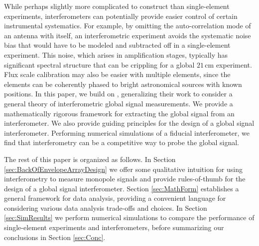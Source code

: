 \documentclass[twocolumn,apj,numberedappendix]{emulateapj}
\newcommand{\mep}[1]{{\color{applegreen} \textbf{[MEP:  #1]}}}
\begin{document}
While perhaps slightly more complicated to construct than single-element experiments, interferometers can potentially provide easier control of certain instrumental systematics. For example, by omitting the auto-correlation mode of an antenna with itself, an interferometric experiment avoids the systematic noise bias that would have to be modeled and subtracted off in a single-element experiment. This noise, which arises in amplification stages, typically has significant spectral structure that can be crippling for a global $21\,\textrm{cm}$ experiment. Flux scale calibration may also be easier with multiple elements, since the elements can be coherently phased to bright astronomical sources with known positions. In this paper, we build on \citet{VedanthamLOFAR2}, generalizing their work to consider a general theory of interferometric global signal measurements.  We provide a mathematically rigorous framework for extracting the global signal from an interferometer. We also provide guiding principles for the design of a global signal interferometer. Performing numerical simulations of a fiducial interferometer, we find that interferometry can be a competitive way to probe the global signal.


The rest of this paper is organized as follows.  In Section \ref{sec:BackOfEnvelopeArrayDesign} we offer some qualitative intuition for using interferometry to measure monopole signals and provide rules-of-thumb for the design of a global signal interferometer. Section \ref{sec:MathForm} establishes a general framework for data analysis, providing a convenient language for considering various data analysis trade-offs and choices. In Section \ref{sec:SimResults} we perform numerical simulations to compare the performance of single-element experiments and interferometers, before summarizing our conclusions in Section \ref{sec:Conc}.

\end{document}
